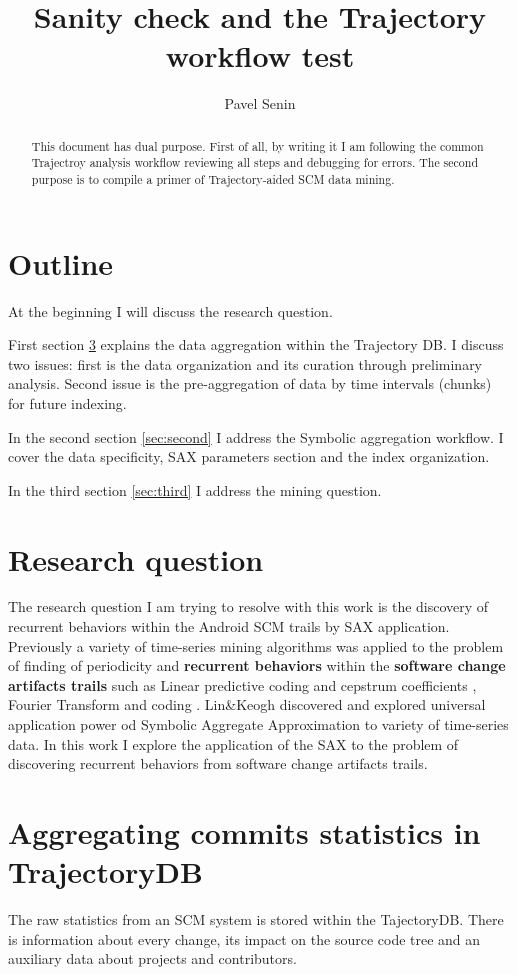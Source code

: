 \documentclass[a4paper,10pt]{article}
\title{Sanity check and the Trajectory workflow test}
\author{Pavel Senin}
\numberwithin{equation}{subsection}
\begin{document}
\maketitle

\begin{abstract}
This document has dual purpose. First of all, by writing it I am following the common Trajectroy analysis workflow reviewing 
all steps and debugging for errors. The second purpose is to compile a primer of Trajectory-aided SCM data mining.
\end{abstract}

\section{Outline}
At the beginning I will discuss the research question.

First section \ref{sec:first} explains the data aggregation within the Trajectory DB. I discuss two issues: first is
the data organization and its curation through preliminary analysis. Second issue is the pre-aggregation of data by 
time intervals (chunks) for future indexing.

In the second section \ref{sec:second} I address the Symbolic aggregation workflow. I cover the data specificity,
SAX parameters section and the index organization.

In the third section \ref{sec:third} I address the mining question.

\section{Research question}
The research question I am trying to resolve with this work is the discovery of recurrent behaviors within the Android SCM
trails by SAX application. Previously a variety of time-series mining algorithms was applied to the problem of finding
of periodicity and \textbf{recurrent behaviors} within the \textbf{software change artifacts trails} such as Linear predictive
coding and cepstrum coefficients \cite{citeulike:3378725}, Fourier Transform \cite{citeulike:10377345}
and coding \cite{citeulike:10377366}. Lin\&Keogh \cite{citeulike:2821475} discovered and explored universal application power 
od Symbolic Aggregate Approximation to variety of time-series data. In this work I explore the application of
the SAX to the problem of discovering recurrent behaviors from software change artifacts trails.


\section{Aggregating commits statistics in TrajectoryDB}\label{sec:first}
The raw statistics from an SCM system is stored within the TajectoryDB. There is information about every change, its impact
on the source code tree and an auxiliary data about projects and contributors.
\end{document}
